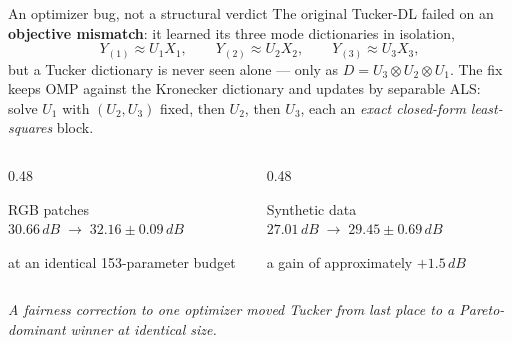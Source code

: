 \documentclass[aspectratio=169,9pt]{beamer}
\newcommand{\dB}{\,dB}
\newcommand{\kron}{\otimes}
\newcommand{\credit}[1]{{\scriptsize\color{muted}#1}}
\newcommand{\takeaway}[1]{\begin{center}\textit{\small #1}\end{center}}
\begin{document}
\begin{frame}{An optimizer bug, not a structural verdict}
\small
The original Tucker-DL failed on an \textbf{objective mismatch}: it learned its
three mode dictionaries in isolation,
\[ Y_{(1)} \approx U_1 X_1, \qquad Y_{(2)} \approx U_2 X_2, \qquad Y_{(3)} \approx U_3 X_3, \]
but a Tucker dictionary is never seen alone --- only as
$D = U_3 \kron U_2 \kron U_1$. The fix keeps OMP against the Kronecker dictionary
and updates by separable ALS: solve $U_1$ with $(U_2,U_3)$ fixed, then $U_2$,
then $U_3$, each an \emph{exact closed-form least-squares} block.

\medskip
\begin{columns}[T,onlytextwidth]
\begin{column}{0.48\textwidth}
\begin{exampleblock}{RGB patches}
\centering $30.66\dB \;\longrightarrow\; 32.16 \pm 0.09\dB$

\credit{at an identical 153-parameter budget}
\end{exampleblock}
\end{column}
\begin{column}{0.48\textwidth}
\begin{exampleblock}{Synthetic data}
\centering $27.01\dB \;\longrightarrow\; 29.45 \pm 0.69\dB$

\credit{a gain of approximately $+1.5\dB$}
\end{exampleblock}
\end{column}
\end{columns}
\takeaway{A fairness correction to one optimizer moved Tucker from last place to
a Pareto-dominant winner at identical size.}
\end{frame}
\end{document}
